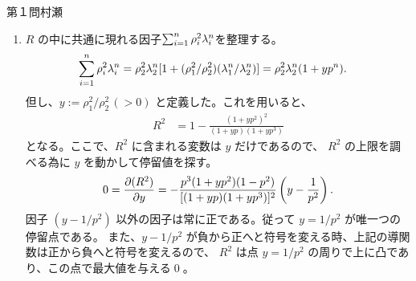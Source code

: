 \begin{answer}{第１問}{村瀬}
\begin{enumerate}
\item
  $R$ の中に共通に現れる因子$\nsum{i}\rho_i^2\lambda_i^n$を整理する。
  \begin{align*}
    \nsum{i} \rho_i^2 \lambda_i^n
      &= \rho_2^2 \lambda_2^n [1 + (\rho_1^2/\rho_2^2) (\lambda_1^n/\lambda_2^n)]
       = \rho_2^2 \lambda_2^n (1+yp^n).
  \end{align*}
  但し、$y := \rho_1^2/\rho_2^2\,(>0)$ と定義した。これを用いると、
  \begin{align*}
    R^2
      &= 1-\frac{(1+yp^2)^2}{(1+yp)(1+yp^3)}
  \end{align*}
  となる。ここで、$R^2$ に含まれる変数は $y$ だけであるので、
  $R^2$ の上限を調べる為に $y$ を動かして停留値を探す。
  \begin{align*}
    0 = \pdiff[(R^2)]y
      = -\frac{p^3(1+yp^2)(1-p^2)}{[(1+yp)(1+yp^3)]^2} \left(y-\frac1{p^2}\right).
  \end{align*}
  因子 $(y-1/p^2)$ 以外の因子は常に正である。従って $y=1/p^2$ が唯一つの停留点である。
  また、$y-1/p^2$ が負から正へと符号を変える時、上記の導関数は正から負へと符号を変えるので、
  $R^2$ は点 $y=1/p^2$ の周りで上に凸であり、この点で最大値を与える\qed。

\end{enumerate}
\end{answer}
